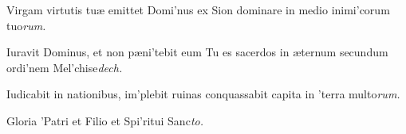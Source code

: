 \newpage
{}
\par
\vskip9mm
\begin{multicols}{2}\setlength{\columnseprule}{0.2px}
Virgam virtutis tuæ emittet Domi'nus ex Sion \grestar{} dominare in medio inimi'corum tuo\textit{rum.}\par
{}\par
Iuravit Dominus, et non pæni'tebit eum \grestar{} Tu es sacerdos in æternum secundum ordi'nem Mel'chise\textit{dech.}\par
{}\par
Iudicabit in nationibus, im'plebit ruinas \grestar{} conquassabit capita in 'terra multo\textit{rum.}\par
{}\par
Gloria 'Patri et Filio \grestar{} et Spi'ritui Sanc\textit{to.}\par
{}
\end{multicols}\par
